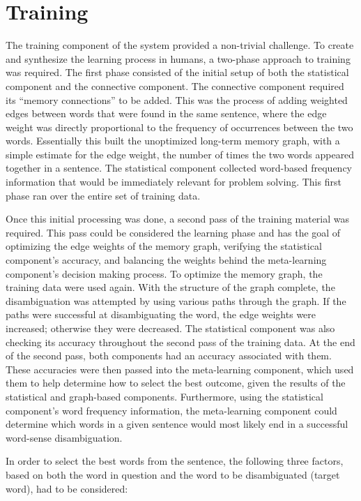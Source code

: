 \section{Training}

The training component of the system provided a non-trivial challenge.  To
create and synthesize the learning process in humans, a two-phase approach to
training was required.  The first phase consisted of the initial setup of both
the statistical component and the connective component. The connective component
required its ``memory connections'' to be added.  This was the process of adding
weighted edges between words that were found in the same sentence, where the
edge weight was directly proportional to the frequency of occurrences between
the two words. Essentially this built the unoptimized long-term memory graph, with a
simple estimate for the edge weight, the number of times the two words appeared together 
in a sentence.  The statistical component collected word-based frequency information 
that would be immediately relevant for problem solving.  This first phase ran over 
the entire set of training data.

Once this initial processing was done, a second pass of the training material
was required.  This pass could be considered the learning phase and has the goal 
of optimizing the edge weights of the memory graph, verifying the statistical 
component's accuracy, and balancing the weights behind the meta-learning component's 
decision making process.  To optimize the memory graph, the training data were used 
again. With the structure of the graph complete, the disambiguation was attempted 
by using various paths through the graph.  If the paths were successful at disambiguating 
the word, the edge weights were increased; otherwise they were decreased. The 
statistical component was also checking its accuracy throughout the second pass of 
the training data.  At the end of the second pass, both 
components had an accuracy associated with them. These accuracies were then 
passed into the meta-learning component, which used them to help determine how to 
select the best outcome, given the results of the statistical and graph-based components.  
Furthermore, using the statistical component's word frequency information, the 
meta-learning component could determine which words in a given sentence would most 
likely end in a successful word-sense disambiguation. 

In order to select the best words from the sentence, the following three factors, based on both the 
word in question and the word to be disambiguated (target word), had to be considered: 

